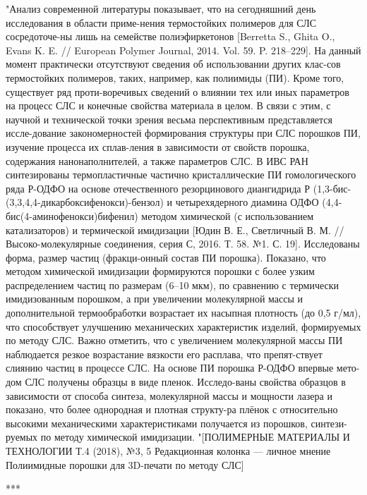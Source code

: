 	
	"Анализ современной литературы показывает, что на сегодняшний день исследования в области приме-нения термостойких полимеров для СЛС сосредоточе-ны лишь на семействе полиэфиркетонов [Berretta S., Ghita O., Evans K. E. // European Polymer Journal, 2014. Vol. 59. P. 218–229]. На данный момент практически отсутствуют сведения об использовании других клас-сов термостойких полимеров, таких, например, как полиимиды (ПИ). Кроме того, существует ряд проти-воречивых сведений о влиянии тех или иных параметров на процесс СЛС и конечные свойства материала в целом. В связи с этим, с научной и технической точки зрения весьма перспективным представляется иссле-дование закономерностей формирования структуры при СЛС порошков ПИ, изучение процесса их сплав-ления в зависимости от свойств порошка, содержания нанонаполнителей, а также параметров СЛС.
	В ИВС РАН синтезированы термопластичные частично кристаллические ПИ гомологического ряда Р-ОДФО на основе отечественного резорцинового диангидрида Р (1,3-бис-(3,3,4,4-дикарбоксифенокси)-бензол) и четырехядерного диамина ОДФО (4,4-бис(4-аминофенокси)бифенил) методом химической (с использованием катализаторов) и термической имидизации [Юдин В. Е., Светличный В. М. // Высоко-молекулярные соединения, серия С, 2016. Т. 58. №1. С. 19]. Исследованы форма, размер частиц (фракци-онный состав ПИ порошка). Показано, что методом химической имидизации формируются порошки с более узким распределением частиц по размерам (6–10 мкм), по сравнению с термически имидизованным порошком, а при увеличении молекулярной массы и дополнительной термообработки возрастает их насыпная плотность (до 0,5 г/мл), что способствует улучшению механических характеристик изделий, формируемых по методу СЛС. Важно отметить, что с увеличением молекулярной массы ПИ наблюдается резкое возрастание вязкости его расплава, что препят-ствует слиянию частиц в процессе СЛС.
На основе ПИ порошка Р-ОДФО впервые мето-дом СЛС получены образцы в виде пленок. Исследо-ваны свойства образцов в зависимости от способа синтеза, молекулярной массы и мощности лазера и показано, что более однородная и плотная структу-ра плёнок с относительно высокими механическими характеристиками получается из порошков, синтези-руемых по методу химической имидизации.
	"[ПОЛИМЕРНЫЕ МАТЕРИАЛЫ И ТЕХНОЛОГИИ Т.4 (2018), №3, 5
Редакционная колонка — личное мнение
Полиимидные порошки для 3D-печати по методу СЛС]
	
	
	***
	

